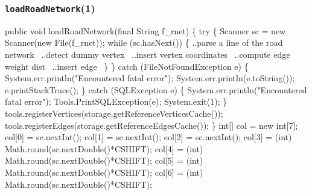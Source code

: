 \documentclass{article}
\def\nwendcode{\endtrivlist \endgroup}      %
\let\nwdocspar=\par
\begin{document}
\subsubsection{{\tt{}\protect{}loadRoadNetwork}(1)}
\nwenddocs{}\endmoddef{}
public void loadRoadNetwork(final String f_rnet) \{
  try \{
    Scanner sc = new Scanner(new File(f_rnet));
    while (sc.hasNext()) \{
      \LA{}..parse a line of the road network~{\nwtagstyle{}}\RA{}
      \LA{}..detect dummy vertex~{\nwtagstyle{}}\RA{}
      \LA{}..insert vertex coordinates~{\nwtagstyle{}}\RA{}
      \LA{}..compute edge weight \code{}dist\edoc{}~{\nwtagstyle{}}\RA{}
      \LA{}..insert edge~{\nwtagstyle{}}\RA{}
    \}
  \} catch (FileNotFoundException e) \{
    System.err.println("Encountered fatal error");
    System.err.println(e.toString());
    e.printStackTrace();
  \} catch (SQLException e) \{
    System.err.println("Encountered fatal error");
    Tools.PrintSQLException(e);
    System.exit(1);
  \}
  tools.registerVertices(storage.getReferenceVerticesCache());
  tools.registerEdges(storage.getReferenceEdgesCache());
\}
\eatline
{}\nwendcode{}\endmoddef{}
int[] col = new int[7];
col[0] = sc.nextInt();
col[1] = sc.nextInt();
col[2] = sc.nextInt();
col[3] = (int) Math.round(sc.nextDouble()*CSHIFT);
col[4] = (int) Math.round(sc.nextDouble()*CSHIFT);
col[5] = (int) Math.round(sc.nextDouble()*CSHIFT);
col[6] = (int) Math.round(sc.nextDouble()*CSHIFT);
\nwendcode{}\nwdocspar
\end{document}
